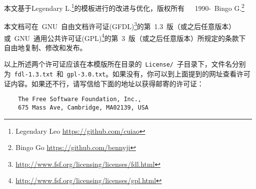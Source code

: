 本文基于Legendary L.\footnote{Legendary Leo \url{https://github.com/cuiao}}的模板进行的改进与优化，版权所有~~\textcopyright~1990-\the\year~Bingo G.\footnote{Bingo Go \url{https://github.com/bennyji}}

本文档可在~GNU~自由文档许可证(GFDL)\footnote{\url{http://www.fsf.org/licensing/licenses/fdl.html}}的第~1.3~版（或之后任意版本）或~GNU~通用公共许可证(GPL)\footnote{\url{http://www.fsf.org/licensing/licenses/gpl.html}}的第~3~版（或之后任意版本）所规定的条款下自由地复制、修改和发布。


以上所述两个许可证应该在本模版所在目录的~\verb|License/|~子目录下，文件名分别为~\verb|fdl-1.3.txt|~和~\verb|gpl-3.0.txt|。如果没有，你可以到上面提到的网址查看许可证内容。如果还不行，请写信给下面的地址以获得邮寄的许可证：
\begin{verbatim}
    The Free Software Foundation, Inc.,
    675 Mass Ave, Cambridge, MA02139, USA
\end{verbatim}